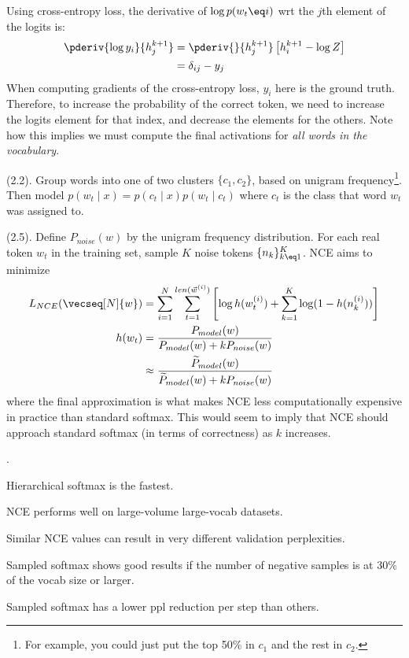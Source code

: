 \documentclass[11pt]{article}
\begin{document}
Using cross-entropy loss, the derivative of $\log p(w_t\eq i)$ wrt the $j$th element of the logits is:
\begin{align}
\pderiv{ \log y_i }{ h_j^{k+1} }
&= \pderiv{}{h_j^{k+1}} \left[  
h^{k+1}_i - \log Z 
\right] \\
&= \delta_{ij} - y_j
\end{align}
When computing gradients of the cross-entropy loss, $y_i$ here is the ground truth. Therefore, to increase the probability of the correct token, we need to increase the logits element for that index, and decrease the elements for the others. Note how this implies we must compute the final activations for \textit{all words in the vocabulary}. 

 (2.2). Group words into one of two clusters $\{c_1, c_2\}$, based on unigram frequency\footnote{For example, you could just put the top 50\% in $c_1$ and the rest in $c_2$.}. Then model $p(w_t \mid x) = p(c_t \mid x) p(w_t \mid c_t)$ where $c_t$ is the class that word $w_t$ was assigned to.

 (2.5). Define $P_{noise}(w)$ by the unigram frequency distribution. For each real token $w_t$ in the training set, sample $K$ noise tokens $\{ n_k \}_{k \eq 1}^{K}$. NCE aims to minimize
\begin{align}
L_{NCE}(   \vecseq[N]{w}   ) &= \sum_{i=1}^{N} \sum_{t=1}^{len(\vec w^{(i)})  } \left[ 
\log h(w_t^{(i)}) + \sum_{k=1}^{K} \log (  1 - h( n_k^{(i)}  )   ) 
\right] \\
h(w_t) 
&= \frac{ P_{model}(w) }{   P_{model}(w) + k P_{noise}(w)   } \\
&\approx \frac{ \widetilde P_{model}(w) }{  \widetilde  P_{model}(w) + k P_{noise}(w)   } 
\end{align}
where the final approximation is what makes NCE less computationally expensive in practice than standard softmax. This would seem to imply that NCE should approach standard softmax (in terms of correctness) as $k$ increases. 


.
\begin{compactitem}
	\item Hierarchical softmax is the fastest.
	\item NCE performs well on large-volume large-vocab datasets.
	\item Similar NCE values can result in very different validation perplexities. 
	\item Sampled softmax shows good results if the number of negative samples is at 30\% of the vocab size or larger. 
	\item Sampled softmax has a lower ppl reduction per step than others. 
\end{compactitem}
\end{document}
